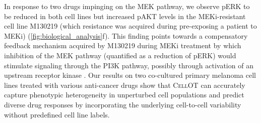  In response to two drugs impinging on the MEK pathway, we observe pERK to be reduced in both cell lines but increased pAKT levels in the MEKi-resistant cell line M130219 (which resistance was acquired during pre-exposing a patient to MEKi) (\cref{fig:biological_analysis}f). This finding points towards a compensatory feedback mechanism acquired by M130219 during MEKi treatment by which inhibition of the MEK pathway (quantified as a reduction of pERK) would stimulate signaling through the PI3K pathway, possibly through activation of an upstream receptor kinase \citep{caunt2015mek1}. 
Our results on two co-cultured primary melanoma cell lines treated with various anti-cancer drugs show that \textsc{CellOT} can accurately capture phenotypic heterogeneity in unperturbed cell populations and predict diverse drug responses by incorporating the underlying cell-to-cell variability without predefined cell line labels. 

